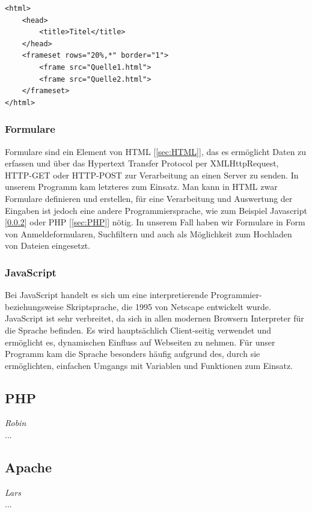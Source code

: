 \documentclass[12pt,a4paper,bibliography=totocnumbered,listof=totocnumbered]{scrartcl}
\begin{document}
\vspace{1em}
\begin{lstlisting}[caption= Beispiel für Frames in HTML, label=lst:HTML]
<html>
	<head>
		<title>Titel</title>
	</head>
	<frameset rows="20%,*" border="1">
		<frame src="Quelle1.html">
		<frame src="Quelle2.html">
	</frameset>
</html>
\end{lstlisting}

\subsubsection{Formulare}
\label{sec:Formulare}
Formulare sind ein Element von HTML [\ref{sec:HTML}], das es ermöglicht Daten zu erfassen und über das Hypertext Transfer Protocol per XMLHttpRequest, HTTP-GET oder HTTP-POST zur Verarbeitung an einen Server zu senden.\cite{Webformular} In unserem Programm kam letzteres zum Einsatz. Man kann in HTML zwar Formulare definieren und erstellen, für eine Verarbeitung und Auswertung der Eingaben ist jedoch eine andere Programmiersprache, wie zum Beispiel Javascript [\ref{sec:JavaScript}] oder PHP [\ref{sec:PHP}] nötig.\cite{HTML/Formulare/Form} In unserem Fall haben wir Formulare in Form von Anmeldeformularen, Suchfiltern und auch als Möglichkeit zum Hochladen von Dateien eingesetzt.

\subsubsection{JavaScript}
\label{sec:JavaScript}
Bei JavaScript handelt es sich um eine interpretierende Programmier- beziehungsweise Skriptsprache, die 1995 von Netscape entwickelt wurde.\cite{JavaScript}\cite{wiki/JavaScript} JavaScript ist sehr verbreitet, da sich in allen modernen Browsern Interpreter für die Sprache befinden. Es wird hauptsächlich Client-seitig verwendet und ermöglicht es, dynamischen Einfluss auf Webseiten zu nehmen.\cite{JavaScript-JS} Für unser Programm kam die Sprache besonders häufig aufgrund des, durch sie ermöglichten, einfachen Umgangs mit Variablen und Funktionen zum Einsatz.

\subsection{PHP}
\label{sec:}
\emph{Robin}\\
...

\subsection{Apache}
\label{sec:Apache}
\emph{Lars}\\
...
\end{document}
